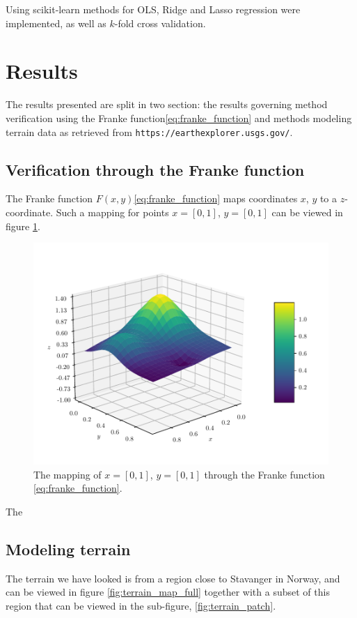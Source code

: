 \documentclass[11pt]{article}
\begin{document}
Using scikit-learn\cite{scikit-learn} methods for OLS, Ridge and Lasso regression were implemented, as well as $k$-fold cross validation.

\section{Results}
The results presented are split in two section: the results governing method verification using the Franke function\eqref{eq:franke_function} and methods modeling terrain data as retrieved from \texttt{https://earthexplorer.usgs.gov/}.

\subsection{Verification through the Franke function}
The Franke function $F(x,y)$\eqref{eq:franke_function} maps coordinates $x$, $y$ to a $z$-coordinate. Such a mapping for points $x=[0,1]$, $y=[0,1]$ can be viewed in figure \ref{fig:franke_function}.
\begin{figure}
    \centering
    \includegraphics[scale=1.0]{../fig/franke_function.pdf}
    \caption{The mapping of $x=[0,1]$, $y=[0,1]$ through the Franke function \eqref{eq:franke_function}.}
    \label{fig:franke_function}
\end{figure}

The 

\subsection{Modeling terrain}
The terrain we have looked is from a region close to Stavanger in Norway, and can be viewed in figure \ref{fig:terrain_map_full} together with a subset of this region that can be viewed in the sub-figure, \ref{fig:terrain_patch}.
\end{document}
